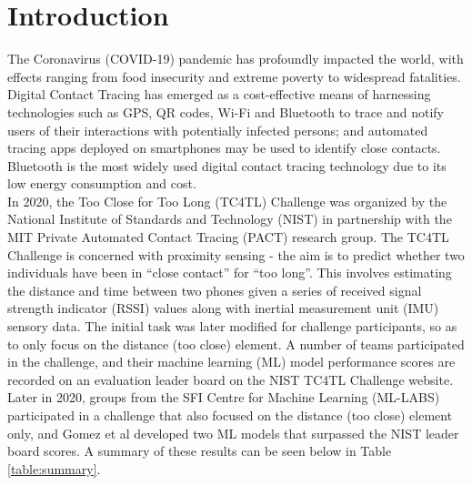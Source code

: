 \documentclass[conference]{IEEEtran}
\begin{document}
\section{Introduction}
The Coronavirus (COVID-19) pandemic has  profoundly impacted the world, with effects ranging from food insecurity and extreme poverty to widespread fatalities. Digital Contact Tracing has emerged as a cost-effective means of harnessing  technologies such as GPS, QR codes, Wi-Fi and Bluetooth to trace and notify users of their interactions with potentially infected persons; and automated tracing apps deployed on smartphones may be used to identify close contacts. Bluetooth is the most widely used digital contact tracing technology due to its low energy consumption and cost.  \cite{b1} \\
\indent In 2020, the Too Close for Too Long (TC4TL) Challenge was organized by the National Institute of Standards and Technology (NIST) in partnership with the MIT Private Automated Contact Tracing (PACT) research group.  \cite{b2} 
The TC4TL Challenge is concerned with proximity sensing - the aim is to predict whether two individuals have been in \enquote{close contact} for \enquote{too long}. This involves estimating the distance and time between two phones given a series of received signal strength indicator (RSSI) values along with  inertial measurement unit (IMU) sensory data.   The initial task was later modified for challenge participants, so as to only focus on the distance (too close)  element.
A number of teams participated in the challenge, and their machine learning (ML) model performance scores are recorded on an evaluation leader board on the NIST TC4TL Challenge website. \cite{b3} Later in 2020, groups from the SFI  Centre  for  Machine Learning (ML-LABS) participated in a challenge that also focused on the distance (too close)  element only, and Gomez et al \cite{b4} developed two ML models that surpassed the NIST leader board  scores.
A summary of these results can be seen below in Table \ref{table:summary}.  \\
\end{document}
